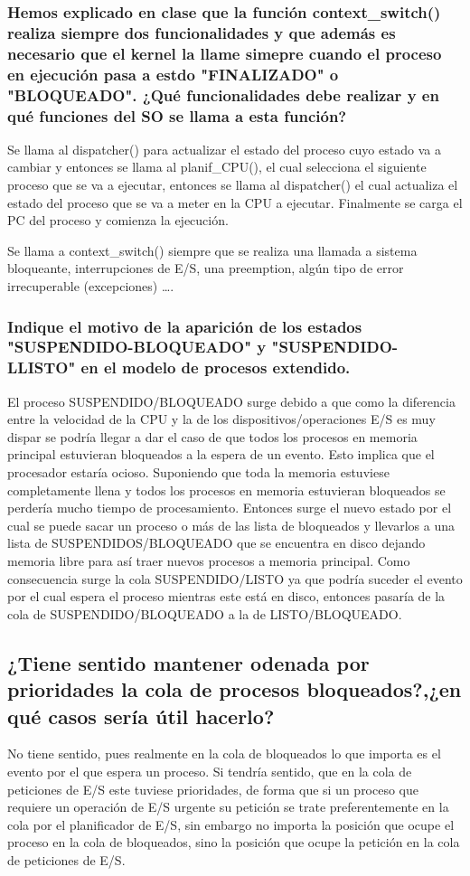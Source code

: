 \documentclass{article}
\begin{document}
				\subsubsection*{Hemos explicado en clase que la función context\_switch() realiza siempre dos funcionalidades y que además es necesario que el kernel la llame simepre cuando el proceso en ejecución pasa a estdo "FINALIZADO" o "BLOQUEADO". ¿Qué funcionalidades debe realizar y en qué funciones del SO se llama a esta función?}
					Se llama al dispatcher() para actualizar el estado del proceso cuyo estado va a cambiar y entonces se llama al planif\_CPU(), el cual selecciona el siguiente proceso que se va a ejecutar, entonces se llama al dispatcher() el cual actualiza el estado del proceso que se va a meter en la CPU a ejecutar. Finalmente se carga el PC del proceso y comienza la ejecución.
					
					Se llama a context\_switch() siempre que se realiza una llamada a sistema bloqueante, interrupciones de E/S, una preemption, algún tipo de error irrecuperable (excepciones) \ldots.
					
				\subsubsection*{Indique el motivo de la aparición de los estados "SUSPENDIDO-BLOQUEADO" y "SUSPENDIDO-LLISTO" en el modelo de procesos extendido.}
					El proceso SUSPENDIDO/BLOQUEADO surge debido a que como la diferencia entre la velocidad de la CPU y la de los dispositivos/operaciones E/S es muy dispar se podría llegar a dar el caso de que todos los procesos en memoria principal estuvieran bloqueados a la espera de un evento. Esto implica que el procesador estaría ocioso. Suponiendo que toda la memoria estuviese completamente llena y todos los procesos en memoria estuvieran bloqueados se perdería mucho tiempo de procesamiento. Entonces surge el nuevo estado por el cual se puede sacar un proceso o más de las lista de bloqueados y llevarlos a una lista de SUSPENDIDOS/BLOQUEADO que se encuentra en disco dejando memoria libre para así traer nuevos procesos a memoria principal. Como consecuencia surge la cola SUSPENDIDO/LISTO ya que podría suceder el evento por el cual espera el proceso mientras este está en disco, entonces pasaría de la cola de SUSPENDIDO/BLOQUEADO a la de LISTO/BLOQUEADO.
					
			\subsection[Pregunta 3]{¿Tiene sentido mantener odenada por prioridades la cola de procesos bloqueados?,¿en qué casos sería útil hacerlo?}
				No tiene sentido, pues realmente en la cola de bloqueados lo que importa es el evento por el que espera un proceso. Si tendría sentido, que en la cola de peticiones de E/S este tuviese prioridades, de forma que si un proceso que requiere un operación de E/S urgente su petición se trate preferentemente en la cola por el planificador de E/S, sin embargo no importa la posición que ocupe el proceso en la cola de bloqueados, sino la posición que ocupe la petición en la cola de peticiones de E/S.
				
\end{document}
